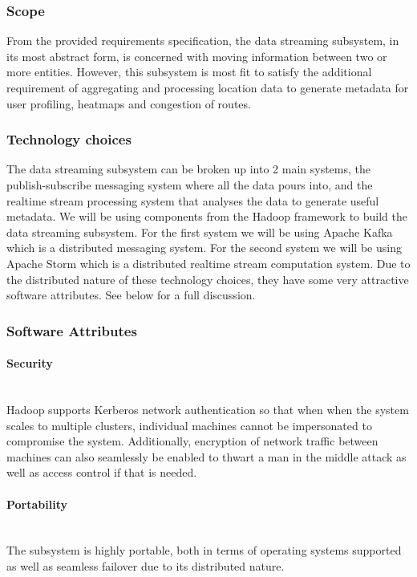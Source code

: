 \subsubsection{Scope}
From the provided requirements specification, the data streaming subsystem, in its most abstract form, is concerned with moving information between two or more entities. However, this subsystem is most fit to satisfy the additional requirement of aggregating and processing location data to generate metadata for user profiling, heatmaps and congestion of routes.

\subsubsection{Technology choices}
The data streaming subsystem can be broken up into 2 main systems, the publish-subscribe messaging system where all the data pours into, and the realtime stream processing system that analyses the data to generate useful metadata.
We will be using components from the Hadoop framework to build the data streaming subsystem. For the first system we will be using Apache Kafka which is a distributed messaging system. For the second system we will be using Apache Storm which is a distributed realtime stream computation system. Due to the distributed nature of these technology choices, they have some very attractive software attributes. See below for a full discussion.

\subsubsection{Software Attributes}

\paragraph{Security}
\mbox{}\\
    Hadoop supports Kerberos network authentication so that when when the system scales to multiple clusters, individual machines cannot be impersonated to compromise the system. Additionally, encryption of network traffic between machines can also seamlessly be enabled to thwart a man in the middle attack as well as access control if that is needed.
\paragraph{Portability}
\mbox{}\\
The subsystem is highly portable, both in terms of operating systems supported as well as seamless failover due to its distributed nature.
